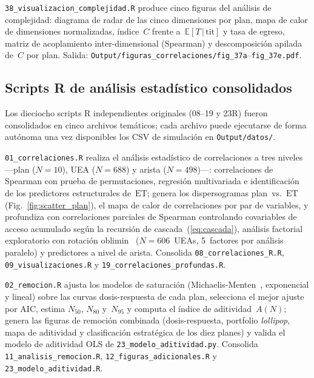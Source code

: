 \documentclass[11pt,letterpaper]{article}
\newcommand{\ETtit}{\mathbb{E}[T\,|\,\mathrm{tit}]}
\begin{document}
\begin{sloppypar}
\texttt{38\_visualizacion\_complejidad.R}
produce cinco figuras del análisis de complejidad: diagrama de radar de las
cinco dimensiones por plan, mapa de calor de dimensiones normalizadas, índice~$C$
frente a~$\ETtit$ y tasa de egreso, matriz de acoplamiento inter-dimensional
(Spearman) y descomposición apilada de~$C$ por plan.
Salida: \texttt{Output/figuras\_correlaciones/fig\_37a}--\texttt{fig\_37e.pdf}.

\subsection{Scripts R de análisis estadístico consolidados}

Los dieciocho scripts R independientes originales (08--19 y 23R) fueron
consolidados en cinco archivos temáticos; cada archivo puede ejecutarse
de forma autónoma una vez disponibles los CSV de simulación en
\texttt{Output/datos/}.

\texttt{01\_correlaciones.R}
realiza el análisis estadístico de correlaciones a tres niveles
---plan ($N=10$), UEA ($N=688$) y arista ($N=498$)---:
correlaciones de Spearman con prueba de permutaciones, regresión
multivariada e identificación de los predictores estructurales
de~$\mathrm{ET}$; genera los dispersogramas plan~vs.~$\mathrm{ET}$
(Fig.~\ref{fig:scatter_plan}), el mapa de calor de correlaciones por
par de variables, y profundiza con correlaciones parciales de Spearman
controlando covariables de acceso acumulado según la recursión de
cascada~(\ref{eq:cascada}), análisis factorial exploratorio con
rotación oblimin~\cite{Horn1965} ($N=606$~UEAs, 5~factores por análisis
paralelo) y predictores a nivel de arista.
Consolida \texttt{08\_correlaciones\_R.R}, \texttt{09\_visualizaciones.R}
y \texttt{19\_correlaciones\_profundas.R}.

\texttt{02\_remocion.R}
ajusta los modelos de saturación (Michaelis-Menten~\cite{Michaelis1913},
exponencial y lineal) sobre las curvas dosis-respuesta de cada plan,
selecciona el mejor ajuste por AIC, estima $N_{50}$, $N_{80}$ y~$N_{95}$
y computa el índice de aditividad~$A(N)$; genera las figuras de remoción
combinada (dosis-respuesta, portfolio \textit{lollipop}, mapa de aditividad
y clasificación estratégica de los diez planes) y valida el modelo
de aditividad OLS de \texttt{23\_modelo\_aditividad.py}.
Consolida \texttt{11\_analisis\_remocion.R}, \texttt{12\_figuras\_adicionales.R}
y \texttt{23\_modelo\_aditividad.R}.


\end{sloppypar}
\end{document}
